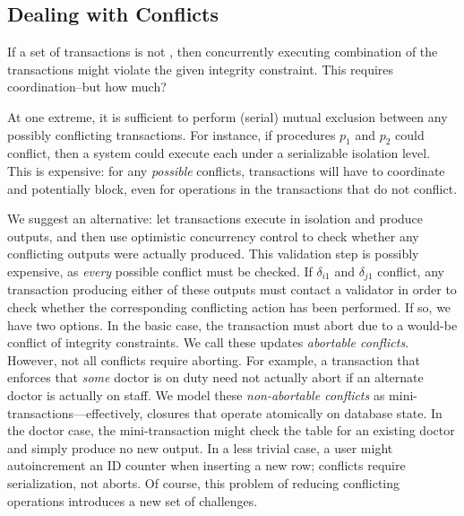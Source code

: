 \subsection{Dealing with Conflicts}

If a set of transactions is not \iconfluent, then concurrently
executing combination of the transactions might violate the given
integrity constraint. This requires coordination--but how much?

At one extreme, it is sufficient to perform (serial) mutual exclusion
between any possibly conflicting transactions. For instance, if
procedures $p_1$ and $p_2$ could conflict, then a system could execute
each under a serializable isolation level. This is expensive: for any
\textit{possible} conflicts, transactions will have to coordinate and
potentially block, even for operations in the transactions that do not
conflict.

We suggest an alternative: let transactions execute in isolation and
produce outputs, and then use optimistic concurrency control to check
whether any conflicting outputs were actually produced. This
validation step is possibly expensive, as \textit{every} possible
conflict must be checked. If $\delta_{i1}$ and $\delta_{j1}$ conflict,
any transaction producing either of these outputs must contact a
validator in order to check whether the corresponding conflicting
action has been performed. If so, we have two options. In the basic
case, the transaction must abort due to a would-be conflict of
integrity constraints. We call these updates \textit{abortable
  conflicts}. However, not all conflicts require aborting. For
example, a transaction that enforces that \textit{some} doctor is on
duty need not actually abort if an alternate doctor is actually on
staff. We model these \textit{non-abortable conflicts} as
mini-transactions---effectively, closures that operate atomically on
database state. In the doctor case, the mini-transaction might check
the table for an existing doctor and simply produce no new output. In
a less trivial case, a user might autoincrement an ID counter when
inserting a new row; conflicts require serialization, not aborts. Of
course, this problem of reducing conflicting operations introduces a
new set of challenges.

